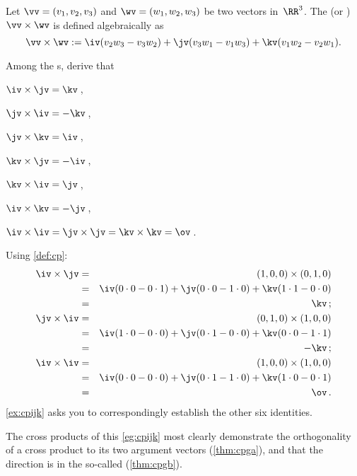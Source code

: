 \begin{definition} \label{def:cp}
Let \(\vv=(v_1,v_2,v_3)\) and \(\wv=(w_1,w_2,w_3)\) be two vectors in~\(\RR^3\).
The   (or ) \(\vv\times\wv\) is defined algebraically as
%
\begin{equation*}
\vv\times\wv:=\iv(v_2w_3-v_3w_2)
+\jv(v_3w_1-v_1w_3)
+\kv(v_1w_2-v_2w_1).
\end{equation*}
\end{definition}



\begin{example} \label{eg:cpijk}
Among the s, derive that 
%
\begin{Parts}
\item \(\iv\times\jv=\kv\)\,, \item \(\jv\times\iv=-\kv\)\,,
\item \(\jv\times\kv=\iv\)\,, \item \(\kv\times\jv=-\iv\)\,,
\item \(\kv\times\iv=\jv\)\,, \item \(\iv\times\kv=-\jv\)\,,
\item \(\iv\times\iv=\jv\times\jv=\kv\times\kv=\ov\)\,.
\end{Parts}
\begin{solution} Using \cref{def:cp}:
\begin{eqnarray*}
\iv\times\jv&=&(1,0,0)\times(0,1,0)
\\&=&\iv(0\cdot0-0\cdot1)
+\jv(0\cdot0-1\cdot0)
+\kv(1\cdot1-0\cdot0)
\\&=&\kv\,;
\\\jv\times\iv&=&(0,1,0)\times(1,0,0)
\\&=&\iv(1\cdot0-0\cdot0)
+\jv(0\cdot1-0\cdot0)
+\kv(0\cdot0-1\cdot1)
\\&=&-\kv\,;
\\\iv\times\iv&=&(1,0,0)\times(1,0,0)
\\&=&\iv(0\cdot0-0\cdot0)
+\jv(0\cdot1-1\cdot0)
+\kv(1\cdot0-0\cdot1)
\\&=&\ov\,.
\end{eqnarray*}
\cref{ex:cpijk} asks you to correspondingly establish the other six identities.
\end{solution}
The cross products of this \cref{eg:cpijk} most clearly demonstrate the orthogonality of a cross product to its two argument vectors (\cref{thm:cpga}), and that the direction is in the so-called  (\cref{thm:cpgb}).
\end{example}




